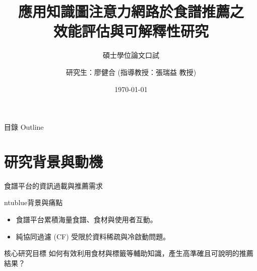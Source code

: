 \documentclass[aspectratio=169, 10pt]{beamer}
\title{應用知識圖注意力網路於食譜推薦之\\效能評估與可解釋性研究}
\subtitle{碩士學位論文口試}
\author{研究生：廖健合 \quad (指導教授：張瑞益 教授)}
\date{\today}
\begin{document}
\inserttitlepage

\begin{frame}{目錄 Outline}
  \tableofcontents
\end{frame}

\section{研究背景與動機}
\begin{frame}{食譜平台的資訊過載與推薦需求}
  \begin{mybox}{ntublue}{背景與痛點}
    \begin{itemize}
      \item 食譜平台累積海量食譜、食材與使用者互動。
      \item 純協同過濾 (CF) 受限於資料稀疏與冷啟動問題。
    \end{itemize}
  \end{mybox}
  
  \begin{examplebox}{核心研究目標}
    如何有效利用食材與標籤等輔助知識，產生高準確且可說明的推薦結果？
  \end{examplebox}
\end{frame}
\end{document}
